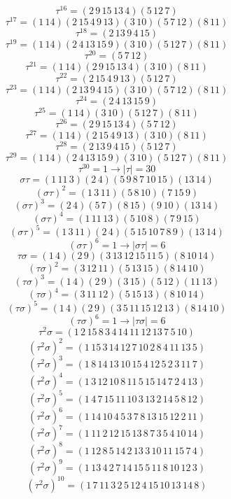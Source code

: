 \documentclass[12pt]{article}
\begin{document}
\begin{itemize}
$$\tau^{16} = (2 \, 9 \, 15 \, 13 \, 4)(5 \, 12 \, 7)$$
$$\tau^{17} = (1 \, 14)(2 \, 15 \, 4 \, 9 \, 13)(3 \, 10) (5 \, 7 \, 12)(8 \, 11)$$
$$\tau^{18} = (2 \, 13 \, 9 \, 4 \, 15)$$
$$\tau^{19} = (1 \, 14)(2 \, 4 \, 13 \, 15 \, 9)(3 \, 10)(5 \, 12 \, 7)(8 \, 11)$$
$$\tau^{20} = (5 \, 7 \, 12)$$
$$\tau^{21} = (1 \, 14)(2 \, 9 \, 15 \, 13 \, 4)(3 \, 10)(8 \, 11)$$
$$\tau^{22} = (2 \, 15 \, 4 \, 9 \, 13)(5 \, 12 \, 7)$$
$$\tau^{23} = (1 \, 14)(2 \, 13 \, 9 \, 4 \, 15)(3 \, 10)(5 \, 7 \, 12)(8 \, 11)$$
$$\tau^{24} = (2 \, 4 \, 13 \, 15 \, 9)$$
$$\tau^{25} = (1 \, 14)(3 \, 10)(5 \, 12 \, 7)(8 \, 11)$$
$$\tau^{26} = (2 \, 9 \, 15 \, 13 \, 4)(5 \, 7 \, 12)$$
$$\tau^{27} = (1 \, 14)(2 \, 15 \, 4 \, 9 \, 13)(3 \, 10)(8 \, 11)$$
$$\tau^{28} = (2 \, 13 \, 9 \, 4 \, 15)(5 \, 12 \, 7)$$
$$\tau^{29} = (1 \, 14)(2 \, 4 \, 13 \, 15 \, 9)(3 \, 10)(5 \, 12 \, 7)(8 \, 11)$$
$$\tau^{30} = 1 \rightarrow |\tau| = 30$$
$$\sigma\tau = (1 \, 11 \, 3)(2 \, 4)(5 \, 9 \, 8 \, 7 \, 10 \, 15)(13 \, 14)$$
$$(\sigma\tau)^2 = (1 \, 3 \, 11)(5 \, 8 \, 10)(7 \, 15 \, 9)$$
$$(\sigma\tau)^3 = (2 \, 4)(5 \, 7)(8 \, 15)(9 \, 10)(13 \, 14)$$
$$(\sigma\tau)^4 = (1 \, 11 \, 13)(5 \, 10 \, 8)(7 \, 9 \, 15)$$
$$(\sigma\tau)^5 = (1 \, 3 \, 11)(2 \, 4)(5 \, 15 \, 10  \, 7 \, 8 \, 9)(13 \, 14)$$
$$(\sigma\tau)^6 = 1 \rightarrow |\sigma\tau| = 6$$
$$\tau\sigma = (1 \, 4)(2 \, 9)(3 \, 13 \, 12 \, 15 \, 11 \, 5)(8 \, 10 \, 14)$$
$$(\tau\sigma)^2 = (3 \, 12 \, 11)(5 \, 13 \, 15)(8 \, 14 \, 10)$$
$$(\tau\sigma)^3 = (1 \, 4)(2 \, 9)(3 \, 15)(5 \, 12)(11 \, 13)$$
$$(\tau\sigma)^4 = (3 \, 11 \, 12)(5 \, 15 \, 13)(8 \, 10 \, 14)$$
$$(\tau\sigma)^5 = (1 \, 4)(2 \, 9)(3 \, 5 \, 11 \, 15 \, 12 \, 13)(8 \, 14 \, 10)$$
$$(\tau\sigma)^6 = 1 \rightarrow |\tau\sigma| = 6$$
$$\tau^2\sigma = (1 \, 2 \, 15 \, 8 \, 3 \, 4 \, 14 \, 11 \, 12 \, 13 \, 7 \, 5 \, 10)$$
$$(\tau^2\sigma)^2 = (1 \, 15 \, 3 \, 14 \, 12 \, 7 \, 10 \, 2 \, 8 \, 4 \, 11 \, 13 \, 5)$$
$$(\tau^2\sigma)^3 = (1 \, 8 \, 14 \, 13 \, 10 \, 15 \, 4 \, 12 \, 5 \, 2 \, 3 \, 11 \, 7)$$
$$(\tau^2\sigma)^4 = (1 \, 3 \, 12 \, 10 \, 8 \, 11 \, 5 \, 15 \, 14 \, 7 \, 2 \, 4 \, 13)$$
$$(\tau^2\sigma)^5 = (1 \, 4 \, 7 \, 15 \, 11 \, 10 \, 3 \, 13 \, 2 \, 14 \, 5 \, 8 \, 12)$$
$$(\tau^2\sigma)^6 = (1 \, 14 \, 10 \, 4 \, 5 \, 3 \, 7 \, 8 \, 13 \, 15 \, 12 \, 2 \, 11)$$
$$(\tau^2\sigma)^7 = (1 \, 11 \, 2 \, 12 \, 15 \, 13 \, 8 \, 7 \, 3 \, 5 \, 4 \, 10 \, 14)$$
$$(\tau^2\sigma)^8 = (1 \, 12 \, 8 \, 5 \, 14 \, 2 \, 13 \, 3 \, 10 \, 11 \, 15 \, 7 \, 4)$$
$$(\tau^2\sigma)^9 = (1 \, 13 \, 4 \, 2 \, 7 \, 14 \, 15 \, 5 \, 11 \, 8 \, 10 \, 12 \, 3)$$
$$(\tau^2\sigma)^{10} = (1 \, 7 \, 11 \, 3 \, 2 \, 5 \, 12 \, 4 \, 15 \, 10 \, 13 \, 14 \, 8)$$

\end{itemize}
\end{document}
